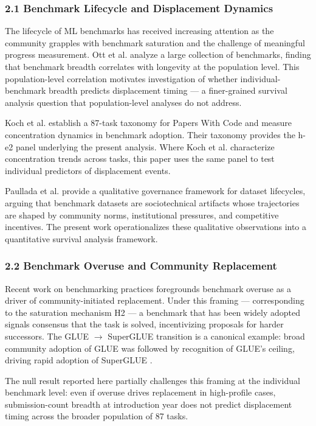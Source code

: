 
\subsubsection{2.1 Benchmark Lifecycle and Displacement Dynamics}

The lifecycle of ML benchmarks has received increasing attention as the community grapples with benchmark saturation and the challenge of meaningful progress measurement. Ott et al. \cite{ott2022benchmark} analyze a large collection of benchmarks, finding that benchmark breadth correlates with longevity at the population level. This population-level correlation motivates investigation of whether individual-benchmark breadth predicts displacement timing --- a finer-grained survival analysis question that population-level analyses do not address.

Koch et al. \cite{koch2021reduced} establish a 87-task taxonomy for Papers With Code and measure concentration dynamics in benchmark adoption. Their taxonomy provides the h-e2 panel underlying the present analysis. Where Koch et al. characterize concentration trends across tasks, this paper uses the same panel to test individual predictors of displacement events.

Paullada et al. \cite{paullada2021data} provide a qualitative governance framework for dataset lifecycles, arguing that benchmark datasets are sociotechnical artifacts whose trajectories are shaped by community norms, institutional pressures, and competitive incentives. The present work operationalizes these qualitative observations into a quantitative survival analysis framework.

\subsubsection{2.2 Benchmark Overuse and Community Replacement}

Recent work on benchmarking practices \cite{iclr2025benchmarking} foregrounds benchmark overuse as a driver of community-initiated replacement. Under this framing --- corresponding to the saturation mechanism H2 --- a benchmark that has been widely adopted signals consensus that the task is solved, incentivizing proposals for harder successors. The GLUE $\rightarrow$ SuperGLUE transition is a canonical example: broad community adoption of GLUE \cite{wang2018glue} was followed by recognition of GLUE's ceiling, driving rapid adoption of SuperGLUE \cite{wang2019superglue}.

The null result reported here partially challenges this framing at the individual benchmark level: even if overuse drives replacement in high-profile cases, submission-count breadth at introduction year does not predict displacement timing across the broader population of 87 tasks.

